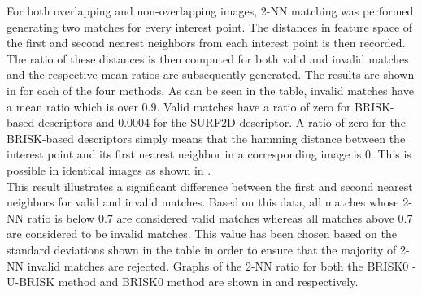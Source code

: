 \documentclass[11pt]{report}
\begin{document}
For both overlapping and non-overlapping images, 2-NN matching was performed generating two matches for every interest point. The distances in feature space of the first and second nearest neighbors from each interest point is then recorded. The ratio of these distances is then computed for both valid and invalid matches and the respective mean ratios are subsequently generated. The results are shown in  for each of the four methods. As can be seen in the table, invalid matches have a mean ratio which is over $0.9$. Valid matches have a ratio of zero for BRISK-based descriptors and $0.0004$ for the SURF2D descriptor. A ratio of zero for the BRISK-based descriptors simply means that the hamming distance between the interest point and its first nearest neighbor in a corresponding image is $0$. This is possible in identical images as shown in .\\ 

This result illustrates a significant difference between the first and second nearest neighbors for valid and invalid matches. Based on this data, all matches whose 2-NN ratio is below $0.7$ are considered valid matches whereas all matches above $0.7$ are considered to be invalid matches. This value has been chosen based on the standard deviations shown in the table in order to ensure that the majority of 2-NN invalid matches are rejected. Graphs of the 2-NN ratio for both the BRISK0 - U-BRISK method and BRISK0 method are shown in  and  respectively. \\
\end{document}
